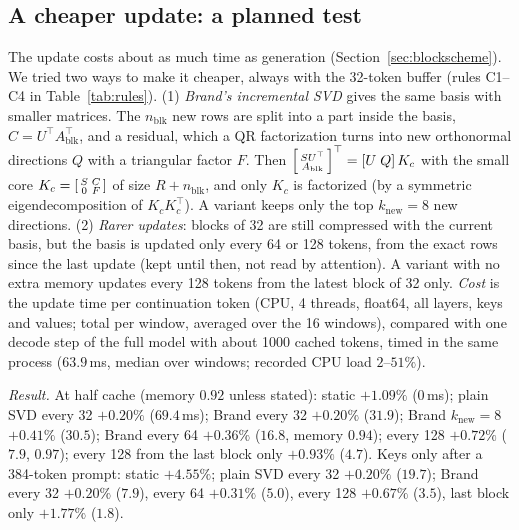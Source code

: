 \documentclass[10pt]{article}
\theoremstyle{plain}
\theoremstyle{definition}
\theoremstyle{remark}
\newcommand{\T}{^{\top}}
\newcommand{\rl}[1]{\textsf{#1}}%
\begin{document}
\subsection{A cheaper update: a planned test}
\label{sec:kvcheap}

The update costs about as much time as generation (Section~\ref{sec:blockscheme}). We tried two ways to make it cheaper, always with the 32-token buffer (rules \rl{C1}--\rl{C4} in Table~\ref{tab:rules}). (1) \emph{Brand's incremental SVD} \cite{brand2006} gives the same basis with smaller matrices. The $n_{\mathrm{blk}}$ new rows are split into a part inside the basis, $C=U\T A_{\mathrm{blk}}\T$, and a residual, which a QR factorization turns into new orthonormal directions $Q$ with a triangular factor $F$. Then $\begin{bsmallmatrix}SU\T\\ A_{\mathrm{blk}}\end{bsmallmatrix}\T=[U\;Q]\,K_c$ with the small core $K_c=\begin{bsmallmatrix}S&C\\0&F\end{bsmallmatrix}$ of size $R+n_{\mathrm{blk}}$, and only $K_c$ is factorized (by a symmetric eigendecomposition of $K_cK_c\T$). A variant keeps only the top $k_{\mathrm{new}}=8$ new directions. (2) \emph{Rarer updates}: blocks of 32 are still compressed with the current basis, but the basis is updated only every 64 or 128 tokens, from the exact rows since the last update (kept until then, not read by attention). A variant with no extra memory updates every 128 tokens from the latest block of 32 only. \emph{Cost} is the update time per continuation token (CPU, 4 threads, float64, all layers, keys and values; total per window, averaged over the 16 windows), compared with one decode step of the full model with about 1000 cached tokens, timed in the same process ($63.9$\,ms, median over windows; recorded CPU load $2$--$51\%$).

\emph{Result.} At half cache (memory $0.92$ unless stated): static $+1.09\%$ (0\,ms); plain SVD every 32 $+0.20\%$ ($69.4$\,ms); Brand every 32 $+0.20\%$ ($31.9$); Brand $k_{\mathrm{new}}=8$ $+0.41\%$ ($30.5$); Brand every 64 $+0.36\%$ ($16.8$, memory $0.94$); every 128 $+0.72\%$ ($7.9$, $0.97$); every 128 from the last block only $+0.93\%$ ($4.7$). Keys only after a 384-token prompt: static $+4.55\%$; plain SVD every 32 $+0.20\%$ ($19.7$); Brand every 32 $+0.20\%$ ($7.9$), every 64 $+0.31\%$ ($5.0$), every 128 $+0.67\%$ ($3.5$), last block only $+1.77\%$ ($1.8$).
\end{document}
